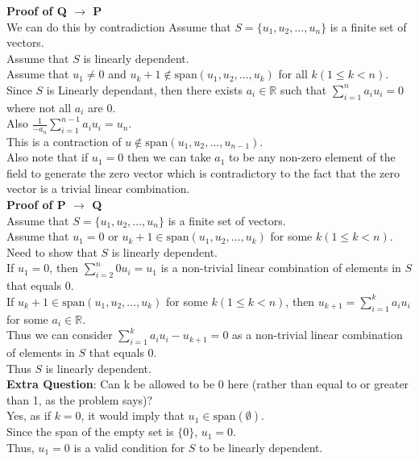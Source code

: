 \documentclass[answers,12pt,addpoints]{exam}
\begin{document}
\begin{questions}
\textbf{Proof of Q $\to$ P}\\
We can do this by contradiction
Assume that $S = \{u_1,u_2,\dots, u_n\}$ is a finite set of vectors.\\
Assume that $S$ is linearly dependent.\\
Assume that $u_1 \neq 0$ and $u_k+1 \notin \text{span}(u_1,u_2,\dots,u_k)$ for all $k (1 \leq k < n)$.\\
Since $S$ is Linearly dependant, then there exists $a_i \in \mathbb{R}$ such that $\sum_{i=1}^{n}a_i u_i = 0$ where not all $a_i$ are 0.\\
Also $\frac{1}{-a_n}\sum_{i=1}^{n-1}a_i u_i = u_n$.\\
This is a contraction of $u \notin \text{span}(u_1,u_2,\dots,u_{n-1})$.\\
Also note that if $u_1 = 0$ then we can take $a_1$ to be any non-zero element of the field to generate the zero vector which is contradictory to the fact that the zero vector is a trivial linear combination.\\

\textbf{Proof of P $\to$ Q }\\
Assume that $S = \{u_1,u_2,\dots, u_n\}$ is a finite set of vectors.\\
Assume that $u_1 = 0$ or $u_k+1 \in \text{span}(u_1,u_2,\dots,u_k)$ for some $k (1 \leq k < n)$.\\
Need to show that $S$ is linearly dependent.\\
If $u_1 = 0$, then $\sum_{i=2}^{n}0 u_i = u_1$ is a non-trivial linear combination of elements in $S$ that equals 0.\\
If $u_k+1 \in \text{span}(u_1,u_2,\dots,u_k)$ for some $k (1 \leq k < n)$, then $u_{k+1} = \sum_{i=1}^{k}a_i u_i$ for some $a_i \in \mathbb{R}$.\\
Thus we can consider $\sum_{i=1}^{k}a_i u_i - u_{k+1} = 0$ as a non-trivial linear combination of elements in $S$ that equals 0.\\
Thus $S$ is linearly dependent.\\

\textbf{Extra Question}: Can k be allowed to be 0 here (rather than equal to or greater than 1, as the problem says)?\\
Yes, as if $k = 0$, it would imply that $u_1 \in \text{span}(\emptyset)$.\\
Since the span of the empty set is $\{0\}$, $u_1 = 0$.\\
Thus, $u_1 = 0$ is a valid condition for $S$ to be linearly dependent.\\






\end{questions}
\end{document}
